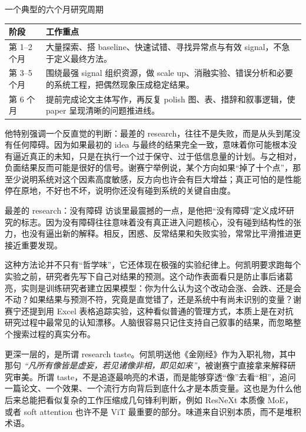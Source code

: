 \documentclass[a4paper,12pt]{article}
\begin{document}
\begin{knowledgebox}{一个典型的六个月研究周期}
\begin{tabularx}{\textwidth}{>{\raggedright\arraybackslash}p{} Y}
\toprule
阶段 & 工作重点 \\
\midrule
第 1--2 个月 & 大量探索、搭 baseline、快速试错、寻找异常点与有效 signal，不急于定义最终方法。 \\
第 3--5 个月 & 围绕最强 signal 组织资源，做 scale up、消融实验、错误分析和必要的系统工程，把偶然现象压成稳定结果。 \\
第 6 个月 & 提前完成论文主体写作，再反复 polish 图、表、措辞和叙事逻辑，使 paper 呈现清晰的问题推进线。 \\
\bottomrule
\end{tabularx}
\end{knowledgebox}

他特别强调一个反直觉的判断：最差的 research，往往不是失败，而是从头到尾没有任何障碍。因为如果最初的 idea 与最终的结果完全一致，意味着你可能根本没有逼近真正的未知，只是在执行一个过于保守、过于低信息量的计划。与之相对，负面结果反而可能是很好的信号。谢赛宁举例说，某个方向如果“掉了十个点”，那至少说明系统对这个因素高度敏感，反方向也许会有巨大增益；真正可怕的是性能停在原地，不好也不坏，说明你还没有碰到系统的关键自由度。

\begin{warningbox}{最差的 research：没有障碍}
访谈里最震撼的一点，是他把“没有障碍”定义成坏研究的标志。因为没有障碍往往意味着没有真正进入问题核心，没有碰到结构性的张力，也没有逼出新的解释。相反，困惑、反常结果和失败实验，常常比平滑推进更接近重要发现。
\end{warningbox}

这种方法论并不只有“哲学味”，它还体现在极强的实验纪律上。何凯明要求跑每个实验之前，研究者先写下自己对结果的预测。这个动作表面看只是防止事后诸葛亮，实则是训练研究者建立因果模型：你为什么认为这个改动会涨、会跌、还是会不动？如果结果与预测不符，究竟是直觉错了，还是系统中有尚未识别的变量？谢赛宁还提到用 Excel 表格追踪实验，这种看似普通的管理方式，本质上是在对抗研究过程中最常见的认知漂移。人脑很容易只记住支持自己叙事的结果，而忽略整个搜索过程的真实分布。

更深一层的，是所谓 research taste。何凯明送他《金刚经》作为入职礼物，其中那句 \textit{``凡所有像皆是虚妄，若见诸像非相，即见如来''}，被谢赛宁直接拿来解释研究审美。所谓 taste，不是追逐最响亮的术语，而是能够穿透“像”去看“相”，追问一篇论文、一个效果、一个流行方向背后到底什么才是本质变量。这也是为什么他后来总能把看似复杂的工作压缩成几句锋利判断，例如 ResNeXt 本质像 MoE，或者 soft attention 也许不是 ViT 最重要的部分。味道来自识别本质，而不是堆积术语。
\end{document}
